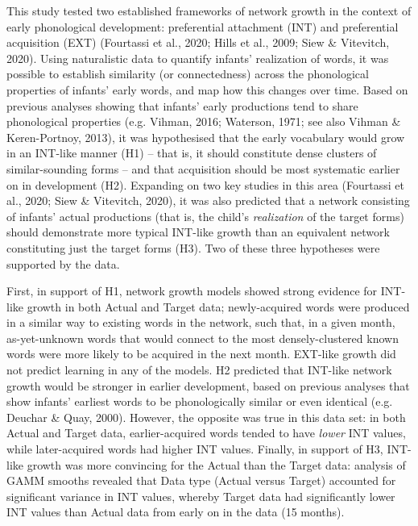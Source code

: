\documentclass[
  man]{apa6}
\begin{document}
This study tested two established frameworks of network growth in the context of early phonological development: preferential attachment (INT) and preferential acquisition (EXT) (Fourtassi et al., 2020; Hills et al., 2009; Siew \& Vitevitch, 2020). Using naturalistic data to quantify infants' realization of words, it was possible to establish similarity (or connectedness) across the phonological properties of infants' early words, and map how this changes over time. Based on previous analyses showing that infants' early productions tend to share phonological properties (e.g. Vihman, 2016; Waterson, 1971; see also Vihman \& Keren-Portnoy, 2013), it was hypothesised that the early vocabulary would grow in an INT-like manner (H1) -- that is, it should constitute dense clusters of similar-sounding forms -- and that acquisition should be most systematic earlier on in development (H2). Expanding on two key studies in this area (Fourtassi et al., 2020; Siew \& Vitevitch, 2020), it was also predicted that a network consisting of infants' actual productions (that is, the child's \emph{realization} of the target forms) should demonstrate more typical INT-like growth than an equivalent network constituting just the target forms (H3). Two of these three hypotheses were supported by the data.

First, in support of H1, network growth models showed strong evidence for INT-like growth in both Actual and Target data; newly-acquired words were produced in a similar way to existing words in the network, such that, in a given month, as-yet-unknown words that would connect to the most densely-clustered known words were more likely to be acquired in the next month. EXT-like growth did not predict learning in any of the models. H2 predicted that INT-like network growth would be stronger in earlier development, based on previous analyses that show infants' earliest words to be phonologically similar or even identical (e.g. Deuchar \& Quay, 2000). However, the opposite was true in this data set: in both Actual and Target data, earlier-acquired words tended to have \emph{lower} INT values, while later-acquired words had higher INT values. Finally, in support of H3, INT-like growth was more convincing for the Actual than the Target data: analysis of GAMM smooths revealed that Data type (Actual versus Target) accounted for significant variance in INT values, whereby Target data had significantly lower INT values than Actual data from early on in the data (15 months).
\end{document}
